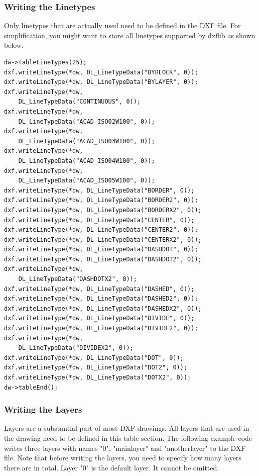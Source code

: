 \subsubsection*{Writing the Linetypes}
Only linetypes that are actually used need to be defined in the DXF file. For simplification, you might want to store all linetypes supported by dxflib as shown below.
\begin{verbatim}
dw->tableLineTypes(25);
dxf.writeLineType(*dw, DL_LineTypeData("BYBLOCK", 0));
dxf.writeLineType(*dw, DL_LineTypeData("BYLAYER", 0));
dxf.writeLineType(*dw,
    DL_LineTypeData("CONTINUOUS", 0));
dxf.writeLineType(*dw, 
    DL_LineTypeData("ACAD_ISO02W100", 0));
dxf.writeLineType(*dw, 
    DL_LineTypeData("ACAD_ISO03W100", 0));
dxf.writeLineType(*dw, 
    DL_LineTypeData("ACAD_ISO04W100", 0));
dxf.writeLineType(*dw, 
    DL_LineTypeData("ACAD_ISO05W100", 0));
dxf.writeLineType(*dw, DL_LineTypeData("BORDER", 0));
dxf.writeLineType(*dw, DL_LineTypeData("BORDER2", 0));
dxf.writeLineType(*dw, DL_LineTypeData("BORDERX2", 0));
dxf.writeLineType(*dw, DL_LineTypeData("CENTER", 0));
dxf.writeLineType(*dw, DL_LineTypeData("CENTER2", 0));
dxf.writeLineType(*dw, DL_LineTypeData("CENTERX2", 0));
dxf.writeLineType(*dw, DL_LineTypeData("DASHDOT", 0));
dxf.writeLineType(*dw, DL_LineTypeData("DASHDOT2", 0));
dxf.writeLineType(*dw, 
    DL_LineTypeData("DASHDOTX2", 0));
dxf.writeLineType(*dw, DL_LineTypeData("DASHED", 0));
dxf.writeLineType(*dw, DL_LineTypeData("DASHED2", 0));
dxf.writeLineType(*dw, DL_LineTypeData("DASHEDX2", 0));
dxf.writeLineType(*dw, DL_LineTypeData("DIVIDE", 0));
dxf.writeLineType(*dw, DL_LineTypeData("DIVIDE2", 0));
dxf.writeLineType(*dw, 
    DL_LineTypeData("DIVIDEX2", 0));
dxf.writeLineType(*dw, DL_LineTypeData("DOT", 0));
dxf.writeLineType(*dw, DL_LineTypeData("DOT2", 0));
dxf.writeLineType(*dw, DL_LineTypeData("DOTX2", 0));
dw->tableEnd();
\end{verbatim}



\subsubsection*{Writing the Layers}
Layers are a substantial part of most DXF drawings. All layers that are used in the drawing need to be defined in this table section. The following example code writes three layers with names "0", "mainlayer" and "anotherlayer" to the DXF file. Note that before writing the layers, you need to specify how many layers there are in total. Layer "0" is the default layer. It cannot be omitted.

